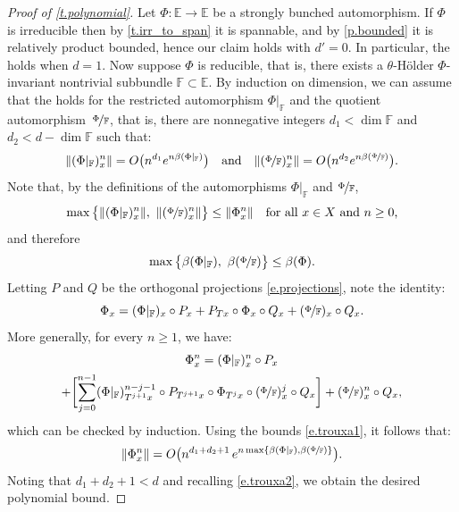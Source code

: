 \documentclass[10pt]{amsart}
\theoremstyle{plain}
\theoremstyle{definition}
\newcommand{\EE}{\mathbb{E}}
\newcommand{\FF}{\mathbb{F}}
\begin{document}
\begin{proof}[Proof of \cref{t.polynomial}]
Let $\Phi \colon \EE \to \EE$ be a strongly bunched automorphism.
If $\Phi$ is irreducible then by \cref{t.irr_to_span} it is spannable, and by \cref{p.bounded} it is relatively product bounded, hence our claim holds with $d'=0$.
In particular, the  holds when $d=1$.
Now suppose $\Phi$ is reducible, that is, there exists a $\theta$-Hölder $\Phi$\nobreakdash-invariant nontrivial subbundle $\FF \subset \EE$.
By induction on dimension, we can assume that the  holds for the restricted automorphism $\Phi|_{\FF}$ and the quotient automorphism~$\nicefrac{\Phi}{\FF}$, that is, there are nonnegative integers $d_1 < \dim \FF$ and $d_2 < d - \dim \FF$ such that:
\begin{equation}\label{e.trouxa1}
\| (\Phi|_\FF)_x^n \| = O \bigl(n^{d_1} e^{n \beta(\Phi|_\FF)} \bigr)
\quad \text{and} \quad
\| (\nicefrac{\Phi}{\FF})_x^n \| = O \bigl(n^{d_2} e^{n \beta(\nicefrac{\Phi}{\FF})} \bigr).
\end{equation}
Note that, by the definitions of the automorphisms $\Phi|_\FF$ and $\nicefrac{\Phi}{\FF}$,
\[
\max \big\{ \| (\Phi|_\FF)_x^n \|, \ \| (\nicefrac{\Phi}{\FF})_x^n \| \big\} \le \| \Phi_x^n \|
\quad \text{for all $x\in X$ and $n \ge 0$,}
\]
and therefore
\begin{equation}\label{e.trouxa2}
\max \big\{ \beta(\Phi|_\FF), \ \beta(\nicefrac{\Phi}{\FF}) \big\} \le \beta(\Phi).
\end{equation}
Letting $P$ and $Q$ be the orthogonal projections \eqref{e.projections}, note the identity:
\[
\Phi_x = (\Phi|_\FF)_x \circ P_x + P_{Tx} \circ \Phi_x \circ Q_x + (\nicefrac{\Phi}{\FF})_x \circ Q_x.
\]
More generally, for every $n \ge 1$, we have:
\begin{multline}\label{e.trouxa3}
\Phi^n_x = (\Phi|_\FF)^n_x \circ P_x\\
+
\biggl[ \sum_{j=0}^{n-1} (\Phi|_\FF)^{n-j-1}_{T^{j+1}x} \circ P_{T^{j+1} x} \circ \Phi_{T^j x} \circ (\nicefrac{\Phi}{\FF})^j_x \circ Q_x \biggr] +
(\nicefrac{\Phi}{\FF})^n_x \circ Q_x,
\end{multline}
which can be checked by induction.
Using the bounds \eqref{e.trouxa1}, it follows that:
\[
\| \Phi_x^n \| = O \bigl(n^{d_1+d_2+1} \, e^{n \max \{ \beta(\Phi|_\FF), \beta(\nicefrac{\Phi}{\FF})\} }\bigr).
\]
Noting that $d_1 + d_2 + 1 < d$ and recalling \eqref{e.trouxa2}, we obtain the desired polynomial bound.
\end{proof}
\end{document}
